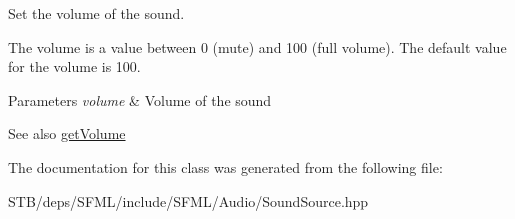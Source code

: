 Set the volume of the sound. 

The volume is a value between 0 (mute) and 100 (full volume). The default value for the volume is 100.


\begin{DoxyParams}{Parameters}
{\em volume} & Volume of the sound\\
\hline
\end{DoxyParams}
\begin{DoxySeeAlso}{See also}
\hyperlink{classsf_1_1_sound_source_aafb0558fce9cbebfc6828d932cbcce2f}{get\+Volume} 
\end{DoxySeeAlso}


The documentation for this class was generated from the following file\+:\begin{DoxyCompactItemize}
\item 
S\+T\+B/deps/\+S\+F\+M\+L/include/\+S\+F\+M\+L/\+Audio/Sound\+Source.\+hpp\end{DoxyCompactItemize}
